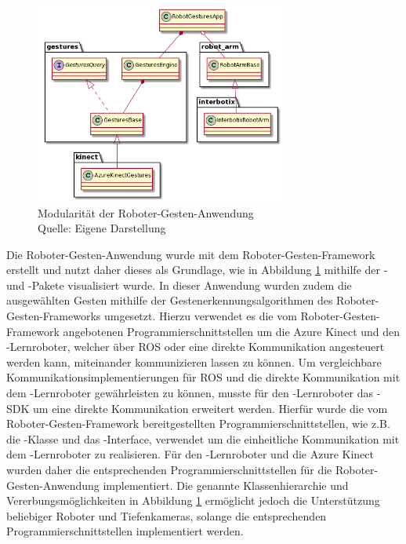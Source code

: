\begin{figure}[htb]
	\centering
	\includegraphics[width=0.75\textwidth]{images/loesungsweg/gesture_robot_system_uml}
	\caption[Modularität der Roboter-Gesten-Anwendung]{Modularität der Roboter-Gesten-Anwendung\\Quelle: Eigene Darstellung}
	\label{fig:gesture_robot_system_uml}
\end{figure}
\FloatBarrier

Die Roboter-Gesten-Anwendung wurde mit dem Roboter-Gesten-Framework erstellt und nutzt daher dieses als Grundlage, wie in Abbildung \ref{fig:gesture_robot_system_uml} mithilfe der - und -Pakete visualisiert wurde. In dieser Anwendung wurden zudem die ausgewählten Gesten mithilfe der Gestenerkennungsalgorithmen des Roboter-Gesten-Frameworks umgesetzt. Hierzu verwendet es die vom Roboter-Gesten-Framework angebotenen Programmierschnittstellen um die Azure Kinect und den -Lernroboter, welcher über ROS oder eine direkte Kommunikation angesteuert werden kann, miteinander kommunizieren lassen zu können. Um vergleichbare Kommunikationsimplementierungen für ROS und die direkte Kommunikation mit dem -Lernroboter gewährleisten zu können, musste für den -Lernroboter das -SDK um eine direkte Kommunikation erweitert werden. Hierfür wurde die vom Roboter-Gesten-Framework bereitgestellten Programmierschnittstellen, wie z.B. die -Klasse und das -Interface, verwendet um die einheitliche Kommunikation mit dem -Lernroboter zu realisieren. Für den -Lernroboter und die Azure Kinect wurden daher die entsprechenden Programmierschnittstellen für die Roboter-Gesten-Anwendung implementiert. Die genannte Klassenhierarchie und Vererbungsmöglichkeiten in Abbildung \ref{fig:gesture_robot_system_uml} ermöglicht jedoch die Unterstützung beliebiger Roboter und Tiefenkameras, solange die entsprechenden Programmierschnittstellen implementiert werden.\\

